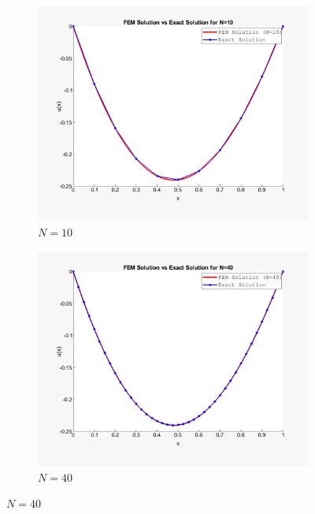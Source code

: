 \documentclass[11pt]{ctexart}
\begin{document}
\begin{figure}[htbp]
    \centering
    \begin{subfigure}{0.45\textwidth}
        \centering
        \includegraphics[width=\linewidth]{10.png}
        \caption{$ N=10 $ }
        \label{fig:sub1}
    \end{subfigure}
    \hfill
    \begin{subfigure}{0.45\textwidth}
        \centering
        \includegraphics[width=\linewidth]{40.png}
        \caption{$ N=40 $ }
        \label{fig:sub2}
    \end{subfigure}
    

\end{figure}
\end{document}
